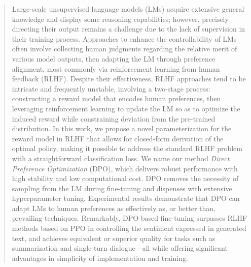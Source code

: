 \begin{abstract}
Large-scale unsupervised language models (LMs) acquire extensive general knowledge and display some reasoning capabilities; however, precisely directing their output remains a challenge due to the lack of supervision in their training process. Approaches to enhance the controllability of LMs often involve collecting human judgments regarding the relative merit of various model outputs, then adapting the LM through preference alignment, most commonly via reinforcement learning from human feedback (RLHF). Despite their effectiveness, RLHF approaches tend to be intricate and frequently unstable, involving a two-stage process: constructing a reward model that encodes human preferences, then leveraging reinforcement learning to update the LM so as to optimize the induced reward while constraining deviation from the pre-trained distribution. In this work, we propose a novel parameterization for the reward model in RLHF that allows for closed-form derivation of the optimal policy, making it possible to address the standard RLHF problem with a straightforward classification loss. We name our method \textit{Direct Preference Optimization} (DPO), which delivers robust performance with high stability and low computational cost. DPO removes the necessity of sampling from the LM during fine-tuning and dispenses with extensive hyperparameter tuning. Experimental results demonstrate that DPO can adapt LMs to human preferences as effectively as, or better than, prevailing techniques. Remarkably, DPO-based fine-tuning surpasses RLHF methods based on PPO in controlling the sentiment expressed in generated text, and achieves equivalent or superior quality for tasks such as summarization and single-turn dialogue—all while offering significant advantages in simplicity of implementation and training.
\end{abstract}


